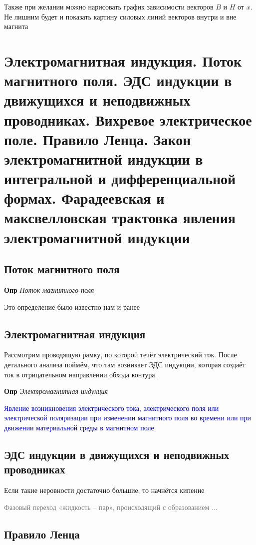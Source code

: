\documentclass[a4paper, 14pt]{article}
\begin{document}
    Также при желании можно нарисовать график зависимости векторов $B$ и $H$ от $x$.
    Не лишним будет и показать картину силовых линий векторов внутри и вне магнита
    
    \section{Электромагнитная индукция.
    Поток магнитного поля.
    ЭДС индукции в движущихся и неподвижных проводниках.
    Вихревое электрическое поле.
    Правило Ленца.
    Закон электромагнитной индукции в интегральной и дифференциальной формах.
    Фарадеевская и максвелловская трактовка явления электромагнитной индукции}
    
    \subsection{Поток магнитного поля}
    
    \textbf{Опр} \textit{Поток магнитного поля}
    
    Это определение было известно нам и ранее
    
    \subsection{Электромагнитная индукция}
    
    Рассмотрим проводящую рамку, по которой течёт электрический ток.
    После детального анализа поймём, что там возникает ЭДС индукции, которая создаёт ток в отрицательном направлении
    обхода контура.
    
    \textbf{Опр} \textit{Электромагнитная индукция}
    
    \textcolor{blue}{Явление возникновения электрического тока, электрического поля или электрической поляризации при
    изменении магнитного поля во времени или при движении материальной среды в магнитном поле}
    
    \subsection{ЭДС индукции в движущихся и неподвижных проводниках}
    
    Если такие неровности достаточно большие, то начнётся кипение
    
    \textcolor{gray}{Фазовый переход «жидкость -- пар», происходящий с образованием ...}
    
    \subsection{Правило Ленца}
    
\end{document}
